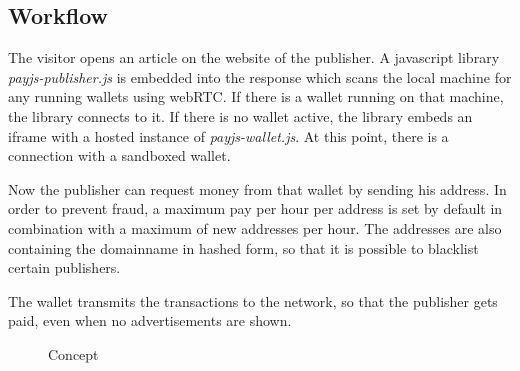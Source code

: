 \documentclass[a4paper]{article}
\begin{document}
\newpage
\subsection{Workflow}
The visitor opens an article on the website of the publisher. A javascript library \textit{payjs-publisher.js} is embedded into the response which scans the local machine for any running wallets using webRTC. If there is a wallet running on that machine, the library connects to it. If there is no wallet active, the library embeds an iframe with a hosted instance of \textit{payjs-wallet.js}. At this point, there is a connection with a sandboxed wallet.

Now the publisher can request money from that wallet by sending his address. In order to prevent fraud, a maximum pay per hour per address is set by default in combination with a maximum of new addresses per hour. The addresses are also containing the domainname in hashed form, so that it is possible to blacklist certain publishers.

The wallet transmits the transactions to the network, so that the publisher gets paid, even when no advertisements are shown.



\begin{figure}[htbp]
	
	\caption{Concept}
\end{figure}
\end{document}
